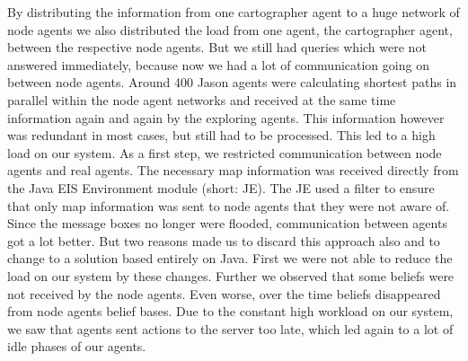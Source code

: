 By distributing the information from one cartographer agent to a huge network of node agents we also distributed the load from one agent, the cartographer agent, between the respective node agents.
But we still had queries which were not answered immediately, because now we had a lot of communication going on between node agents.
Around 400 Jason agents were calculating shortest paths in parallel within the node agent networks and received at the same time information again and again by the exploring agents.
This information however was redundant in most cases, but still had to be processed.
This led to a high load on our system.
As a first step, we restricted communication between node agents and real agents.
The necessary map information was received directly from the Java EIS Environment module (short: JE).
The JE used a filter to ensure that only map information was sent to node agents that they were not aware of.
Since the message boxes no longer were flooded, communication between agents got a lot better.
But two reasons made us to discard this approach also and to change to a solution based entirely on Java.
First we were not able to reduce the load on our system by these changes.
Further we observed that some beliefs were not received by the node agents.
Even worse, over the time beliefs disappeared from node agents belief bases.
Due to the constant high workload on our system, we saw that agents sent actions to the server too late, which led again to a lot of idle phases of our agents.

